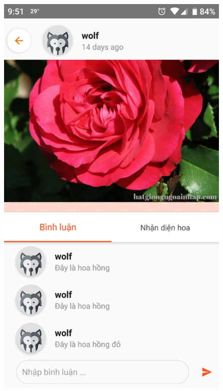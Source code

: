 \documentclass[12pt]{report}
\begin{document}
				
		\begin{figure}[h]
			\centering
			\includegraphics[scale=0.2]{app_comment}

\end{figure}
\end{document}

